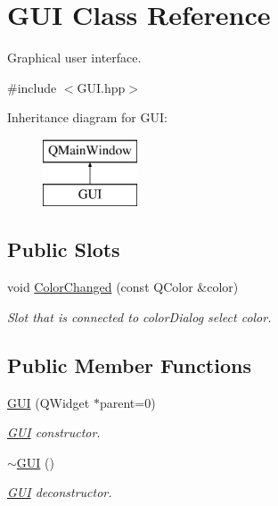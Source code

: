 \hypertarget{classGUI}{}\section{G\+UI Class Reference}
\label{classGUI}


Graphical user interface.  




{\ttfamily \#include $<$G\+U\+I.\+hpp$>$}

Inheritance diagram for G\+UI\+:\begin{figure}[H]
\begin{center}
\leavevmode
\includegraphics[height=2.000000cm]{classGUI}
\end{center}
\end{figure}
\subsection*{Public Slots}
\begin{DoxyCompactItemize}
\item 
void \mbox{\hyperlink{classGUI_a38e10347906d9b19c2970a8cef79a455}{Color\+Changed}} (const Q\+Color \&color)
\begin{DoxyCompactList}\small\item\em Slot that is connected to color\+Dialog select color. \end{DoxyCompactList}\end{DoxyCompactItemize}
\subsection*{Public Member Functions}
\begin{DoxyCompactItemize}
\item 
\mbox{\hyperlink{classGUI_acb0ba8c6fc121d814d30560e2c29f2fe}{G\+UI}} (Q\+Widget $\ast$parent=0)
\begin{DoxyCompactList}\small\item\em \mbox{\hyperlink{classGUI}{G\+UI}} constructor. \end{DoxyCompactList}\item 
\mbox{\hyperlink{classGUI_ac9cae2328dcb5d83bdfaeca49a2eb695}{$\sim$\+G\+UI}} ()
\begin{DoxyCompactList}\small\item\em \mbox{\hyperlink{classGUI}{G\+UI}} deconstructor. \end{DoxyCompactList}\end{DoxyCompactItemize}


